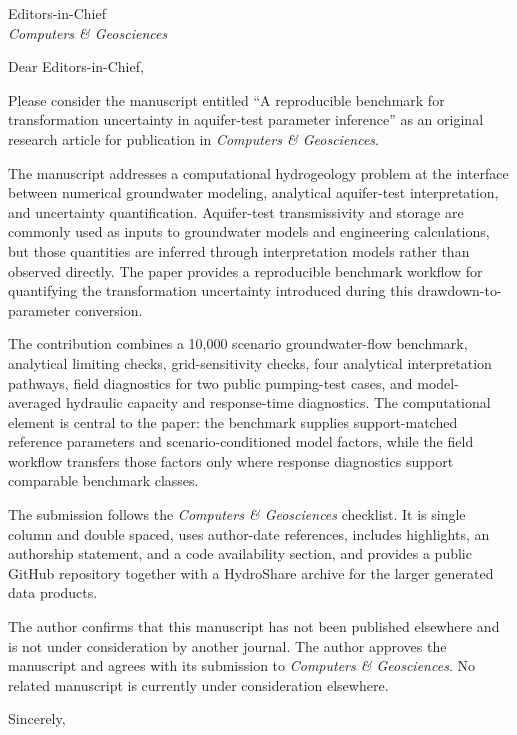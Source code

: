 ﻿\documentclass[11pt]{letter}
\begin{document}
\begin{letter}{Editors-in-Chief\\\emph{Computers \& Geosciences}}
\opening{Dear Editors-in-Chief,}

Please consider the manuscript entitled ``A reproducible benchmark for transformation uncertainty in aquifer-test parameter inference'' as an original research article for publication in \emph{Computers \& Geosciences}.

The manuscript addresses a computational hydrogeology problem at the interface between numerical groundwater modeling, analytical aquifer-test interpretation, and uncertainty quantification. Aquifer-test transmissivity and storage are commonly used as inputs to groundwater models and engineering calculations, but those quantities are inferred through interpretation models rather than observed directly. The paper provides a reproducible benchmark workflow for quantifying the transformation uncertainty introduced during this drawdown-to-parameter conversion.

The contribution combines a 10,000 scenario groundwater-flow benchmark, analytical limiting checks, grid-sensitivity checks, four analytical interpretation pathways, field diagnostics for two public pumping-test cases, and model-averaged hydraulic capacity and response-time diagnostics. The computational element is central to the paper: the benchmark supplies support-matched reference parameters and scenario-conditioned model factors, while the field workflow transfers those factors only where response diagnostics support comparable benchmark classes.

The submission follows the \emph{Computers \& Geosciences} checklist. It is single column and double spaced, uses author-date references, includes highlights, an authorship statement, and a code availability section, and provides a public GitHub repository together with a HydroShare archive for the larger generated data products.

The author confirms that this manuscript has not been published elsewhere and is not under consideration by another journal. The author approves the manuscript and agrees with its submission to \emph{Computers \& Geosciences}. No related manuscript is currently under consideration elsewhere.

\closing{Sincerely,}
\end{letter}
\end{document}
